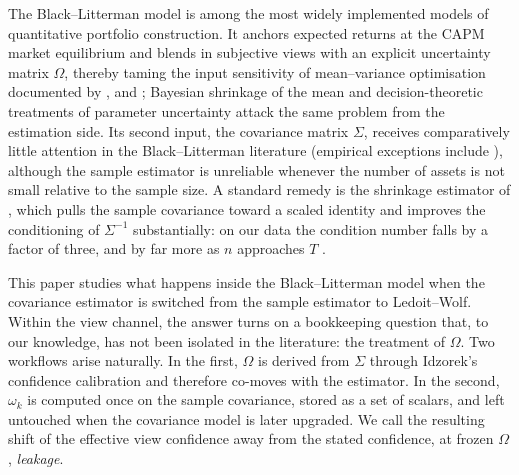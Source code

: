 \documentclass[a4paper,11pt]{article}
\theoremstyle{plain}
\theoremstyle{definition}
\begin{document}
The Black--Litterman model \citep{BlackLitterman1992} is among the most
widely implemented models of quantitative portfolio construction. It
anchors expected returns at the CAPM market equilibrium
\citep{Sharpe1964} and blends in subjective views with an explicit
uncertainty matrix $\Omega$, thereby taming the input sensitivity of
mean--variance optimisation \citep{Markowitz1952} documented by
\citet{Michaud1989}, \citet{BestGrauer1991} and \citet{ChopraZiemba1993};
Bayesian shrinkage of the mean \citep{Jorion1986,FrostSavarino1986} and
decision-theoretic treatments of parameter uncertainty
\citep{KanZhou2007} attack the same problem from the estimation side.
Its second input, the covariance matrix $\Sigma$, receives comparatively
little attention in the Black--Litterman literature (empirical
exceptions include \citealp{BesslerOpferWolff2017}), although the sample
estimator is unreliable whenever the number of assets is not small
relative to the sample size. A standard remedy is the shrinkage
estimator of \citet{LedoitWolf2004}, which pulls the sample covariance
toward a scaled identity and improves the conditioning of $\Sigma^{-1}$
substantially: on our data the condition number falls by a factor of
three, and by far more as $n$ approaches $T$ \citep{LedoitWolfHoney2004}.

This paper studies what happens inside the Black--Litterman model when the
covariance estimator is switched from the sample estimator to Ledoit--Wolf.
Within the view channel, the answer turns on a bookkeeping question
that, to our knowledge, has not been isolated in the literature: the
treatment of $\Omega$. Two workflows arise naturally. In the first, $\Omega$ is
derived from $\Sigma$ through Idzorek's confidence calibration
\citep{Idzorek2007} and therefore co-moves with the estimator. In the
second, $\omega_k$ is computed once on the sample covariance, stored as a
set of scalars, and left untouched when the covariance model is later
upgraded. We call the resulting shift of the effective view confidence
away from the stated confidence, at frozen $\Omega$, \emph{leakage}.
\end{document}
